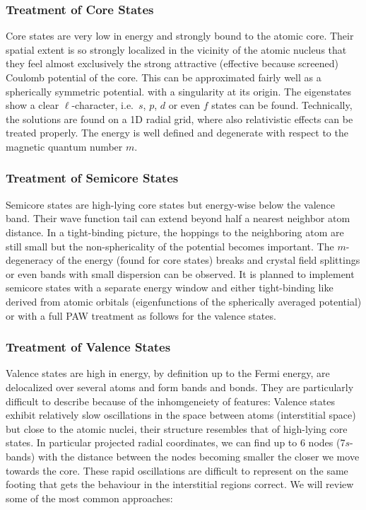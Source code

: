 \documentclass[oribibl]{llncs}
\begin{document}
\subsubsection{Treatment of Core States} \label{sec:core-states}
%
Core states are very low in energy and strongly bound 
to the atomic core.
Their spatial extent is so strongly localized 
in the vicinity of the atomic nucleus 
that they feel almost exclusively the strong attractive 
(effective because screened) Coulomb potential of the core. 
This can be approximated fairly well as a spherically symmetric potential.
with a singularity at its origin.
The eigenstates show a clear $\ell$-character, 
i.e.~$s$, $p$, $d$ or even $f$ states can be found.
Technically, the solutions are found on a 1D radial grid,
where also relativistic effects can be treated properly.
The energy is well defined and degenerate with respect to
the magnetic quantum number $m$.

%
%
\subsubsection{Treatment of Semicore States} \label{sec:semincore-states}
%
Semicore states are high-lying core states
but energy-wise below the valence band.
Their wave function tail can extend beyond half a nearest neighbor atom distance.
In a tight-binding picture, the hoppings to the neighboring atom are still small
but the non-sphericality of the potential becomes important.
The $m$-degeneracy of the energy (found for core states) breaks 
and crystal field splittings or even bands with small dispersion can be observed.
It is planned to implement semicore states with a separate energy window
and either tight-binding like derived from atomic orbitals 
(eigenfunctions of the spherically averaged potential) 
or with a full \ac{PAW} treatment as follows for the valence states.

%
%
\subsubsection{Treatment of Valence States} \label{sec:valence-states}
%
Valence states are high in energy, by definition up to the Fermi
energy, are delocalized over several atoms and form bands and bonds.
They are particularly difficult to describe because of the 
inhomgeneiety of features:
Valence states exhibit relatively slow oscillations 
in the space between atoms (interstitial space) but close to the atomic nuclei,
their structure resembles that of high-lying core states.
In particular projected radial coordinates, we can find up to $6$ nodes
(7$s$-bands) with the distance between the nodes becoming smaller
the closer we move towards the core.
These rapid oscillations are difficult to represent
on the same footing that gets the behaviour in the interstitial regions correct. 
We will review some of the most common approaches:
\end{document}
